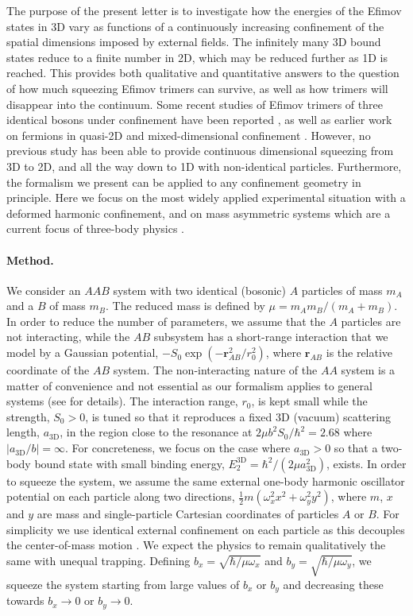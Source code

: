 \documentclass[twocolumn,showpacs,aps,prl,10pt]{revtex4}
\begin{document}
The purpose of the present letter is to investigate how the energies of
the Efimov states in 3D vary as functions of a continuously 
increasing confinement of the spatial dimensions imposed  by
external fields. The infinitely many 3D bound states reduce to a
finite number in 2D, which may be reduced further as 1D is reached.
This provides both qualitative and quantitative answers to the 
question of how much squeezing Efimov trimers can survive, as well
as how trimers will disappear into the continuum. Some recent studies
of Efimov trimers of three identical bosons under confinement have been reported \cite{lev14,yam15}, 
as well as earlier work on fermions in quasi-2D \cite{levinsen2009} and 
mixed-dimensional confinement \cite{nishida2008}.
However, no previous 
study has been able to provide continuous dimensional squeezing from 
3D to 2D, and all the way down to 1D with non-identical particles. 
Furthermore, the formalism we present can be applied to any confinement
geometry in principle. Here we focus on the most widely applied 
experimental situation with a deformed harmonic confinement, and on 
mass asymmetric systems which are a current focus of three-body 
physics \cite{barontini2009,bloom2013,pires2014,tung2014,maier2015,ulmanis2016,wacker2016,johansen2016}. 


\paragraph*{Method.}
We consider an $AAB$ system with two identical (bosonic) $A$ 
particles of mass $m_A$ and a $B$ of mass $m_B$. The reduced mass
is defined by $\mu=m_A m_B/(m_A+m_B)$. In order to reduce the number
of parameters, we assume that the $A$ particles are not interacting,
while the $AB$ subsystem has a short-range interaction that we model
by a Gaussian potential, $-S_0 \exp(-\bm{r}^{2}_{AB}/r_{0}^2)$, where
$\bm{r}_{AB}$ is the relative coordinate of the $AB$ system. The
non-interacting nature of the $AA$ system is a matter of convenience
and not essential as our formalism applies to general systems (see
\cite{supmat} for details).  The interaction range, $r_0$, is kept
small while the strength, $S_0>0$, is tuned so that it reproduces a
fixed 3D (vacuum) scattering length, $a_\textrm{3D}$, in the region
close to the resonance at $2\mu b^2 S_0/ \hbar^2=2.68$ where
$|a_\textrm{3D}/b|=\infty$. For concreteness, we focus on the case
where $a_\textrm{3D}>0$ so that a two-body bound state with small
binding energy, $E_{2}^{\textrm{3D}}= \hbar^2/(2\mu a_\textrm{3D}^2)$,
exists. In order to squeeze the system, we assume the same external
one-body harmonic oscillator potential on each particle along two
directions, $\tfrac{1}{2}m(\omega_{x}^{2}x^{2}+\omega_{y}^{2}y^{2})$,
where $m$, $x$ and $y$ are mass and single-particle Cartesian
coordinates of particles $A$ or $B$.  For simplicity we
use identical external confinement on each particle as this 
decouples the center-of-mass motion
\cite{supmat}. We expect the physics to remain qualitatively the 
same with unequal trapping. Defining $b_x=\sqrt{\hbar/\mu \omega_x}$ and
$b_y=\sqrt{\hbar/\mu \omega_y}$, we squeeze the system starting from
large values of $b_x$ or $b_y$ and decreasing these towards $b_x\to 0$
or $b_y\to 0$.
\end{document}
